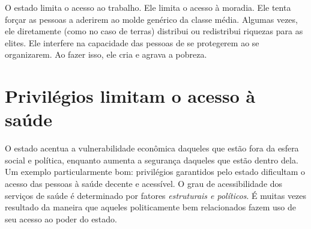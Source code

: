 O estado limita o acesso ao trabalho. Ele limita o acesso à moradia. Ele tenta forçar as pessoas a aderirem ao molde genérico da classe média. Algumas vezes, ele diretamente (como no caso de terras) distribui ou redistribui riquezas para as elites. Ele interfere na capacidade das pessoas de se protegerem ao se organizarem. Ao fazer isso, ele cria e agrava a pobreza.

\section{Privilégios limitam o acesso à saúde}

O estado acentua a vulnerabilidade econômica daqueles que estão fora da esfera social e política, enquanto aumenta a segurança daqueles que estão dentro dela. Um exemplo particularmente bom: privilégios garantidos pelo estado dificultam o acesso das pessoas à saúde decente e acessível. O grau de acessibilidade dos serviços de saúde é determinado por fatores \emph{estruturais e políticos}. É muitas vezes resultado da maneira que aqueles politicamente bem relacionados fazem uso de seu acesso ao poder do estado.

